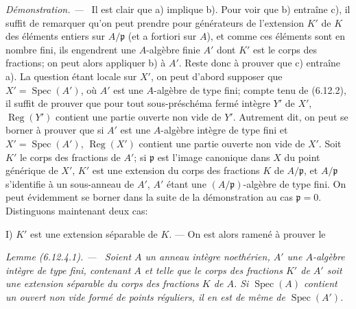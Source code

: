 \documentclass[10pt,oneside]{book}
\newenvironment{lemma}[1][]{%
  \par\medskip\noindent\itshape Lemme (#1). ---\ }{\par}
\newenvironment{proof}{%
  \par\medskip\noindent\textit{Démonstration. ---\ }}{\par}
\begin{document}
\begin{proof}
Il est clair que a) implique b). Pour voir que b) entraîne c), il suffit de
remarquer qu'on peut prendre pour générateurs de l'extension $K'$ de $K$
des éléments entiers sur $A/\mathfrak p$ (et a fortiori sur $A$), et comme
ces éléments sont en nombre fini, ils engendrent une $A$-algèbre finie
$A'$ dont $K'$ est le corps des fractions; on peut alors appliquer b) à
$A'$. Reste donc à prouver que c) entraîne a). La question étant locale sur
$X'$, on peut d'abord supposer que $X'=\operatorname{Spec}(A')$, où $A'$
est une $A$-algèbre de type fini; compte tenu de (6.12.2), il suffit de
prouver que pour tout sous-préschéma fermé intègre $Y'$ de $X'$,
$\operatorname{Reg}(Y')$ contient une partie ouverte non vide de $Y'$.
Autrement dit, on peut se borner à prouver que si $A'$ est une $A$-algèbre
intègre de type fini et $X'=\operatorname{Spec}(A')$,
$\operatorname{Reg}(X')$ contient une partie ouverte non vide de $X'$.
Soit $K'$ le corps des fractions de $A'$; si $\mathfrak p$ est l'image
canonique dans $X$ du point générique de $X'$, $K'$ est une extension du
corps des fractions $K$ de $A/\mathfrak p$, et $A/\mathfrak p$
s'identifie à un sous-anneau de $A'$, $A'$ étant une
$(A/\mathfrak p)$-algèbre de type fini. On peut évidemment se borner dans
la suite de la démonstration au cas $\mathfrak p=0$. Distinguons maintenant
deux cas:

I) $K'$ est une extension séparable de $K$. --- On est alors ramené à
prouver le

\begin{lemma}[6.12.4.1]
\label{IV.2.s6.12.4.1-fr}
Soient $A$ un anneau intègre noethérien, $A'$ une $A$-algèbre intègre de
type fini, contenant $A$ et telle que le corps des fractions $K'$ de $A'$
soit une extension séparable du corps des fractions $K$ de $A$. Si
$\operatorname{Spec}(A)$ contient un ouvert non vide formé de points
réguliers, il en est de même de $\operatorname{Spec}(A')$.
\end{lemma}


\end{proof}
\end{document}

